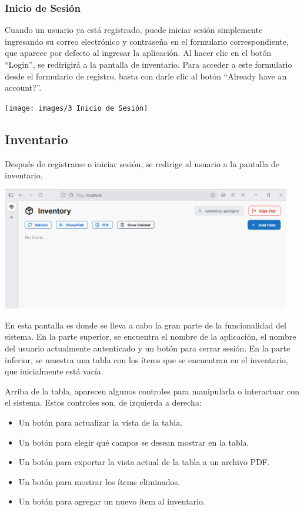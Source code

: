 \subsubsection{Inicio de Sesión}

Cuando un usuario ya está registrado, puede iniciar sesión simplemente ingresando su correo electrónico y contraseña en el formulario correspondiente, que aparece por defecto al ingresar la aplicación. Al hacer clic en el botón “Login”, se redirigirá a la pantalla de inventario. Para acceder a este formulario desde el formulario de registro, basta con darle clic al botón “Already have an account?”.

\begin{center}
\texttt{[image: images/3 Inicio de Sesión]}
\end{center}

\subsection{Inventario}

Después de registrarse o iniciar sesión, se redirige al usuario a la pantalla de inventario.

\begin{center}
\includegraphics[width=0.95\textwidth]{images/4 Inventario}
\end{center}

En esta pantalla es donde se lleva a cabo la gran parte de la funcionalidad del sistema. En la parte superior, se encuentra el nombre de la aplicación, el nombre del usuario actualmente autenticado y un botón para cerrar sesión. En la parte inferior, se muestra una tabla con los ítems que se encuentran en el inventario, que inicialmente está vacía.

Arriba de la tabla, aparecen algunos controles para manipularla o interactuar con el sistema. Estos controles son, de izquierda a derecha:

\begin{itemize}
    \item Un botón para actualizar la vista de la tabla.
    \item Un botón para elegir qué campos se desean mostrar en la tabla.
    \item Un botón para exportar la vista actual de la tabla a un archivo PDF.
    \item Un botón para mostrar los ítems eliminados.
    \item Un botón para agregar un nuevo ítem al inventario.
\end{itemize}

